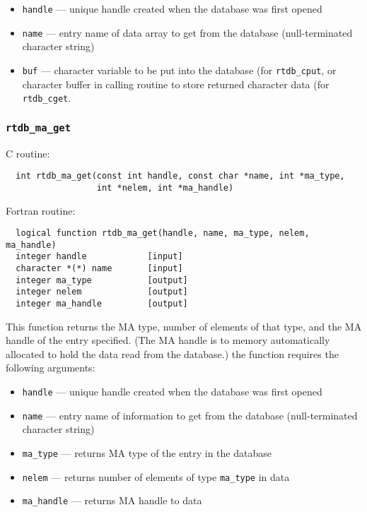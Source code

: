 \begin{itemize}
\item {\tt handle} --- unique handle created when the database was first opened
\item {\tt name} --- entry name of data array to get from the database (null-terminated character string)
\item {\tt buf} --- character variable to be put into the database (for {\tt rtdb\_cput}, or character
buffer in calling routine to store returned character data (for {\tt rtdb\_cget}.
\end{itemize}

\subsubsection{{\tt rtdb\_ma\_get}}

C routine:

\begin{verbatim}
  int rtdb_ma_get(const int handle, const char *name, int *ma_type,
                  int *nelem, int *ma_handle)
\end{verbatim}


Fortran routine:

\begin{verbatim}
  logical function rtdb_ma_get(handle, name, ma_type, nelem, ma_handle)
  integer handle            [input]
  character *(*) name       [input]
  integer ma_type           [output]
  integer nelem             [output]
  integer ma_handle         [output]
\end{verbatim}
This function returns the MA type, number of elements of that type, and the MA handle
of the entry specified.  (The MA handle is to memory
automatically allocated to hold the data read from the database.)  the function requires
the following arguments:

\begin{itemize}  
\item {\tt handle} --- unique handle created when the database was first opened
\item {\tt name} --- entry name of information to get from the database (null-terminated character string)
\item {\tt ma\_type} --- returns MA type of the entry in the database
\item {\tt nelem} --- returns number of elements of type {\tt ma\_type} in data
\item {\tt ma\_handle} --- returns MA handle to data
\end{itemize}


